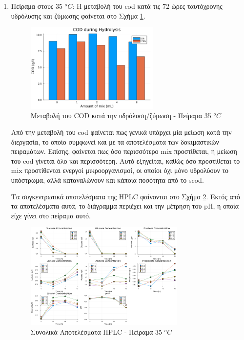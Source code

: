 \documentclass[11pt]{report}
\begin{document}
\begin{enumerate}
\item Πείραμα στους 35 \(^oC\):
\label{sec:orga0cd5f4}
Η μεταβολή του \acrshort{cod} κατά τις 72 ώρες ταυτόχρονης υδρόλυσης και ζύμωσης φαίνεται στο Σχήμα \ref{fig:org27a2a88}.

\begin{figure}[htbp]
\centering
\includegraphics[width=250px]{../plots/10_11/cod_groupedbar_10_11.png}
\caption{\label{fig:org27a2a88}Μεταβολή του COD κατά την υδρόλυση/ζύμωση - Πείραμα 35 \(^oC\)}
\end{figure}

Από την μεταβολή του \acrshort{cod} φαίνεται πως γενικά υπάρχει μία μείωση κατά την διεργασία, το οποίο συμφωνεί και με τα αποτελέσματα των δοκιμαστικών πειραμάτων. Επίσης, φαίνεται πως όσο περισσότερο \acrshort{mix} προστίθεται, η μείωση του \acrshort{cod} γίνεται όλο και περισσότερη. Αυτό εξηγείται, καθώς όσο προστίθεται το \acrshort{mix} προστίθενται ενεργοί μικροοργανισμοί, οι οποίοι όχι μόνο υδρολύουν το υπόστρωμα, αλλά καταναλώνουν και κάποια ποσότητα από το \acrfull{scod}.

Τα συγκεντρωτικά αποτελέσματα της HPLC φαίνονται στο Σχήμα \ref{fig:org4825079}. Εκτός από τα αποτελέσματα αυτά, το διάγραμμα περιέχει και την μέτρηση του pH, η οποία είχε γίνει στο πείραμα αυτό.

\begin{figure}[htbp]
\centering
\includegraphics[width=300px]{../plots/10_11/final_scatter_10_11.png}
\caption{\label{fig:org4825079}Συνολικά Αποτελέσματα HPLC - Πείραμα 35 \(^oC\)}
\end{figure}


\end{enumerate}
\end{document}
